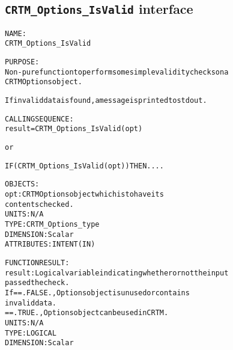 \subsection{\texttt{CRTM\_Options\_IsValid} interface}
  \label{sec:CRTM_Options_IsValid_interface}
  \begin{alltt}
 
  NAME:
        CRTM_Options_IsValid
 
  PURPOSE:
        Non-pure function to perform some simple validity checks on a
        CRTM Options object. 
 
        If invalid data is found, a message is printed to stdout.
 
  CALLING SEQUENCE:
        result = CRTM_Options_IsValid( opt )
 
          or
 
        IF ( CRTM_Options_IsValid( opt ) ) THEN....
 
  OBJECTS:
        opt:       CRTM Options object which is to have its
                   contents checked.
                   UNITS:      N/A
                   TYPE:       CRTM_Options_type
                   DIMENSION:  Scalar
                   ATTRIBUTES: INTENT(IN)
 
  FUNCTION RESULT:
        result:    Logical variable indicating whether or not the input
                   passed the check.
                   If == .FALSE., Options object is unused or contains
                                  invalid data.
                      == .TRUE.,  Options object can be used in CRTM.
                   UNITS:      N/A
                   TYPE:       LOGICAL
                   DIMENSION:  Scalar
 
  \end{alltt}

